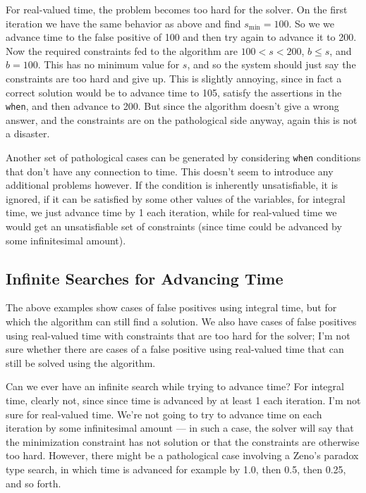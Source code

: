 \documentclass{article}
\begin{document}
For real-valued time, the problem becomes too hard for the solver.  On
the first iteration we have the same behavior as above and find
$s_{\min}=100$.  So we we advance time to the false positive of 100
and then try again to advance it to 200.  Now the required constraints
fed to the algorithm are $100<s<200$, $b \leq s$, and $b=100$.  This
has no minimum value for $s$, and so the system should just say the
constraints are too hard and give up.  This is slightly annoying,
since in fact a correct solution would be to advance time to 105,
satisfy the assertions in the \verb|when|, and then advance to 200.
But since the algorithm doesn't give a wrong answer, and the
constraints are on the pathological side anyway, again this is not a
disaster.

Another set of pathological cases can be generated by considering
\verb|when| conditions that don't have any connection to time.  This
doesn't seem to introduce any additional problems however.  If the
condition is inherently unsatisfiable, it is ignored, if it can be
satisfied by some other values of the variables, for integral time, we
just advance time by 1 each iteration, while for real-valued time we
would get an unsatisfiable set of constraints (since time could be
advanced by some infinitesimal amount).

\subsection{Infinite Searches for Advancing Time}

The above examples show cases of false positives using integral time,
but for which the algorithm can still find a solution.  We also have
cases of false positives using real-valued time with constraints that
are too hard for the solver; I'm not sure whether there are cases of a
false positive using real-valued time that can still be solved using
the algorithm.

Can we ever have an infinite search while trying to advance time?  For
integral time, clearly not, since since time is advanced by at least 1
each iteration.  I'm not sure for real-valued time.  We're not going
to try to advance time on each iteration by some infinitesimal amount
--- in such a case, the solver will say that the minimization
constraint has not solution or that the constraints are otherwise too
hard.  However, there might be a pathological case involving a Zeno's
paradox type search, in which time is advanced for example by 1.0,
then 0.5, then 0.25, and so forth.
\end{document}
